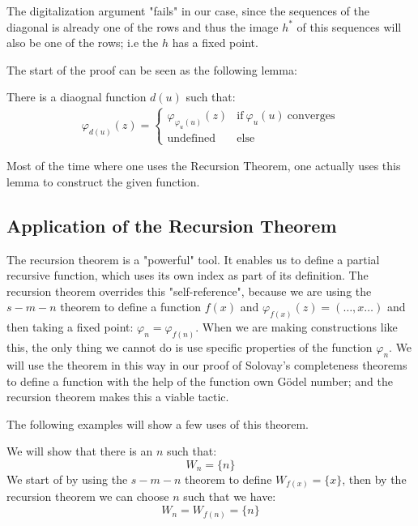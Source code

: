 \documentclass[../main.tex]{subfiles}
\begin{document}
The digitalization argument "fails" in our case, since the sequences of the
diagonal is already one of the rows and thus the image $h^*$ of this
sequences will also be one of the rows; i.e the $h$ has a fixed point.

The start of the proof can be seen as the following lemma:
\begin{lem}
	There is a diaognal function $d(u)$ such that:
	\begin{align}\varphi_{d(u)}(z)=\begin{cases}
		\varphi_{\varphi_u(u)}(z)& \text{if}\ \varphi_u(u)\
		\text{converges}\\
		\text{undefined} & \text{else}
	\end{cases}
	\end{align}
\end{lem}

Most of the time where one uses the Recursion Theorem, one actually uses this
lemma to construct the given function.

\subsection{Application of the Recursion Theorem}
The recursion theorem is a "powerful" tool. It enables us to define a partial
recursive function, which uses its own index as part of its definition. 
The recursion theorem overrides this "self-reference", because we are using the
$s-m-n$ theorem to define a function $f(x)$ and
$\varphi_{f(x)}(z)=(\ldots,x\ldots)$ and then taking a fixed point:
$\varphi_n=\varphi_{f(n)}$.  When we are making constructions like this, the
only thing we cannot do is use specific properties of the function $\varphi_n$.
We will use the theorem in this way in our proof of Solovay's completeness
theorems to define a function with the help of the function own Gödel number; and
the recursion theorem makes this a viable tactic.

The
following examples will show a few uses of this theorem.
\begin{exmp}
	We will show that there is an $n$ such that:
	$$W_n=\{n\}$$
	We start of by using the $s-m-n$ theorem to define $W_{f(x)}=\{x\}$,
	then by the recursion theorem we can choose $n$ such that we have:
	$$W_n=W_{f(n)}=\{n\}$$
\end{exmp}
\end{document}
